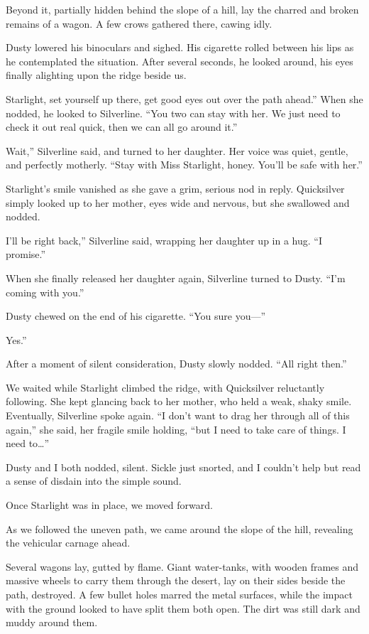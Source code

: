 Beyond it, partially hidden behind the slope of a hill, lay the charred and broken remains of a wagon. A few crows gathered there, cawing idly.

Dusty lowered his binoculars and sighed. His cigarette rolled between his lips as he contemplated the situation. After several seconds, he looked around, his eyes finally alighting upon the ridge beside us.

\leavevmode{}Starlight, set yourself up there, get good eyes out over the path ahead.” When she nodded, he looked to Silverline. “You two can stay with her. We just need to check it out real quick, then we can all go around it.”

\leavevmode{}Wait,” Silverline said, and turned to her daughter. Her voice was quiet, gentle, and perfectly motherly. “Stay with Miss Starlight, honey. You’ll be safe with her.”

Starlight’s smile vanished as she gave a grim, serious nod in reply. Quicksilver simply looked up to her mother, eyes wide and nervous, but she swallowed and nodded.

\leavevmode{}I’ll be right back,” Silverline said, wrapping her daughter up in a hug. “I promise.”

When she finally released her daughter again, Silverline turned to Dusty. “I’m coming with you.”

Dusty chewed on the end of his cigarette. “You sure you—”

\leavevmode{}Yes.”

After a moment of silent consideration, Dusty slowly nodded. “All right then.”

We waited while Starlight climbed the ridge, with Quicksilver reluctantly following. She kept glancing back to her mother, who held a weak, shaky smile. Eventually, Silverline spoke again. “I don’t want to drag her through all of this again,” she said, her fragile smile holding, “but I need to take care of things. I need to…”

Dusty and I both nodded, silent. Sickle just snorted, and I couldn’t help but read a sense of disdain into the simple sound.

Once Starlight was in place, we moved forward.

As we followed the uneven path, we came around the slope of the hill, revealing the vehicular carnage ahead.

Several wagons lay, gutted by flame. Giant water-tanks, with wooden frames and massive wheels to carry them through the desert, lay on their sides beside the path, destroyed. A few bullet holes marred the metal surfaces, while the impact with the ground looked to have split them both open. The dirt was still dark and muddy around them.

